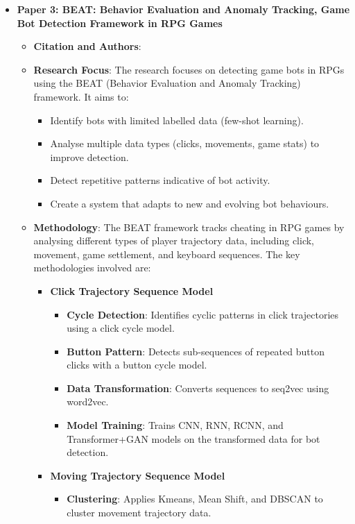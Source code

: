 \documentclass[a4paper, 12pt]{article}
\begin{document}
\begin{itemize}
    \item \textbf{Paper 3: BEAT: Behavior Evaluation and Anomaly Tracking, Game Bot Detection Framework in RPG Games}
    \begin{itemize}
        \item \textbf{Citation and Authors}: \cite{cao_2024_beat}
        \item \textbf{Research Focus}: The research focuses on detecting game bots in RPGs using the BEAT (Behavior Evaluation and Anomaly Tracking) framework. It aims to:
        \begin{itemize}
            \item Identify bots with limited labelled data (few-shot learning).
            \item Analyse multiple data types (clicks, movements, game stats) to improve detection.
            \item Detect repetitive patterns indicative of bot activity.
            \item Create a system that adapts to new and evolving bot behaviours.
        \end{itemize}
        \item \textbf{Methodology}: The BEAT framework tracks cheating in RPG games by analysing different types of player trajectory data, including click, movement, game settlement, and keyboard sequences. The key methodologies involved are:
        \begin{itemize}
            \item \textbf{Click Trajectory Sequence Model}
            \begin{itemize}
                \item \textbf{Cycle Detection}: Identifies cyclic patterns in click trajectories using a click cycle model.
                \item \textbf{Button Pattern}: Detects sub-sequences of repeated button clicks with a button cycle model.
                \item \textbf{Data Transformation}: Converts sequences to seq2vec using word2vec.
                \item \textbf{Model Training}: Trains CNN, RNN, RCNN, and Transformer+GAN models on the transformed data for bot detection.
            \end{itemize}
            \item \textbf{Moving Trajectory Sequence Model}
            \begin{itemize}
                \item \textbf{Clustering}: Applies Kmeans, Mean Shift, and DBSCAN to cluster movement trajectory data.

\end{itemize}
\end{itemize}
\end{itemize}
\end{itemize}
\end{document}
